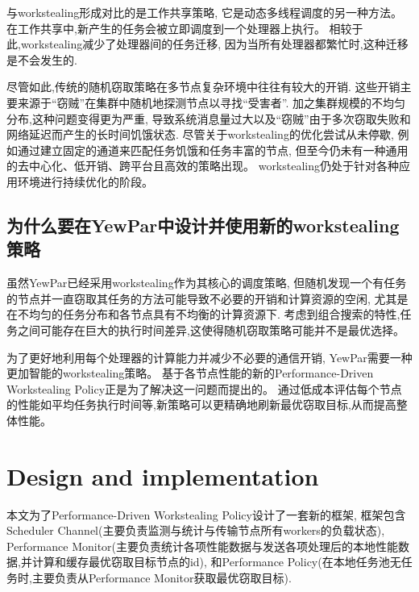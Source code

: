 \documentclass{mproj}
\begin{document}
与workstealing形成对比的是工作共享策略,
它是动态多线程调度的另一种方法。
在工作共享中,新产生的任务会被立即调度到一个处理器上执行。
相较于此,workstealing减少了处理器间的任务迁移,
因为当所有处理器都繁忙时,这种迁移是不会发生的.\cite{10.1145/324133.324234}

尽管如此,传统的随机窃取策略在多节点复杂环境中往往有较大的开销.
这些开销主要来源于“窃贼”在集群中随机地探测节点以寻找“受害者”.
加之集群规模的不均匀分布,这种问题变得更为严重,
导致系统消息量过大以及“窃贼”由于多次窃取失败和网络延迟而产生的长时间饥饿状态.
尽管关于workstealing的优化尝试从未停歇,
例如通过建立固定的通道来匹配任务饥饿和任务丰富的节点\cite{10.1145/2851141.2851175},
但至今仍未有一种通用的去中心化、低开销、跨平台且高效的策略出现。
workstealing仍处于针对各种应用环境进行持续优化的阶段。

\section{为什么要在YewPar中设计并使用新的workstealing策略}

虽然YewPar已经采用workstealing作为其核心的调度策略,
但随机发现一个有任务的节点并一直窃取其任务的方法可能导致不必要的开销和计算资源的空闲,
尤其是在不均匀的任务分布和各节点具有不均衡的计算资源下.
考虑到组合搜索的特性,任务之间可能存在巨大的执行时间差异,这使得随机窃取策略可能并不是最优选择。

为了更好地利用每个处理器的计算能力并减少不必要的通信开销,
YewPar需要一种更加智能的workstealing策略。
基于各节点性能的新的Performance-Driven Workstealing Policy正是为了解决这一问题而提出的。
通过低成本评估每个节点的性能如平均任务执行时间等,新策略可以更精确地刷新最优窃取目标,从而提高整体性能。

\chapter{Design and implementation}

本文为了Performance-Driven Workstealing Policy设计了一套新的框架,
框架包含Scheduler Channel(主要负责监测与统计与传输节点所有workers的负载状态),
Performance Monitor(主要负责统计各项性能数据与发送各项处理后的本地性能数据,并计算和缓存最优窃取目标节点的id),
和Performance Policy(在本地任务池无任务时,主要负责从Performance Monitor获取最优窃取目标).
\end{document}

